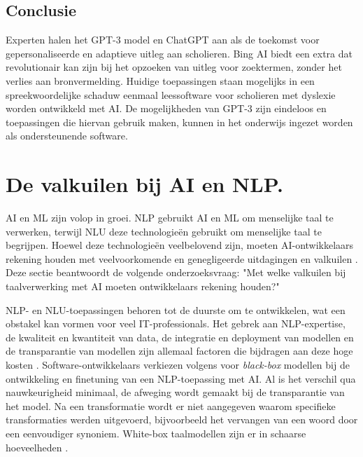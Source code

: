 \subsection{Conclusie}

Experten halen het GPT-3 model en ChatGPT aan als de toekomst voor gepersonaliseerde en adaptieve uitleg aan scholieren. Bing AI biedt een extra dat revolutionair kan zijn bij het opzoeken van uitleg voor zoektermen, zonder het verlies aan bronvermelding. Huidige toepassingen staan mogelijks in een spreekwoordelijke schaduw eenmaal leessoftware voor scholieren met dyslexie worden ontwikkeld met AI. De mogelijkheden van GPT-3 zijn eindeloos en toepassingen die hiervan gebruik maken, kunnen in het onderwijs ingezet worden als ondersteunende software.


\section{De valkuilen bij AI en NLP.}
AI en ML zijn volop in groei. NLP gebruikt AI en ML om menselijke taal te verwerken, terwijl NLU deze technologieën gebruikt om menselijke taal te begrijpen. Hoewel deze technologieën veelbelovend zijn, moeten AI-ontwikkelaars rekening houden met veelvoorkomende en genegligeerde uitdagingen en valkuilen \autocite{Sciforce2020, Roldos2020, Khurana2022}. Deze sectie beantwoordt de volgende onderzoeksvraag: "Met welke valkuilen bij taalverwerking met AI moeten ontwikkelaars rekening houden?"

\medspace

NLP- en NLU-toepassingen behoren tot de duurste om te ontwikkelen, wat een obstakel kan vormen voor veel IT-professionals. Het gebrek aan NLP-expertise, de kwaliteit en kwantiteit van data, de integratie en deployment van modellen en de transparantie van modellen zijn allemaal factoren die bijdragen aan deze hoge kosten \autocite{IBM2022}. Software-ontwikkelaars verkiezen volgens  voor \textit{black-box} modellen bij de ontwikkeling en finetuning van een NLP-toepassing met AI. Al is het verschil qua nauwkeurigheid minimaal, de afweging wordt gemaakt bij de transparantie van het model. Na een transformatie wordt er niet aangegeven waarom specifieke transformaties werden uitgevoerd, bijvoorbeeld het vervangen van een woord door een eenvoudiger synoniem. White-box taalmodellen zijn er in schaarse hoeveelheden \autocite{Punardeep2020}.

\medspace 

